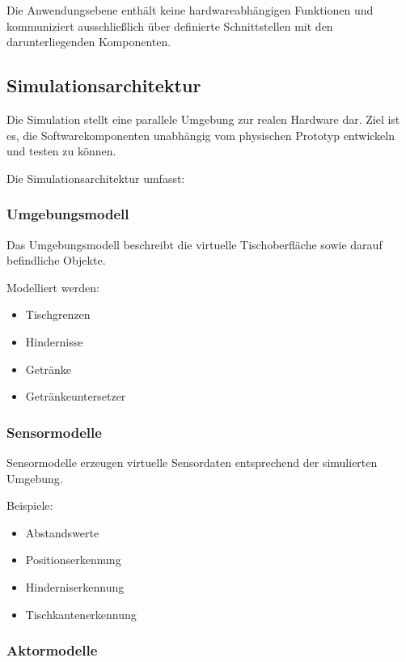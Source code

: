 Die Anwendungsebene enthält keine hardwareabhängigen Funktionen und
kommuniziert ausschließlich über definierte Schnittstellen mit den
darunterliegenden Komponenten.

\subsection{Simulationsarchitektur}\label{simulationsarchitektur}

Die Simulation stellt eine parallele Umgebung zur realen Hardware dar.
Ziel ist es, die Softwarekomponenten unabhängig vom physischen Prototyp
entwickeln und testen zu können.

Die Simulationsarchitektur umfasst:

\subsubsection{Umgebungsmodell}\label{umgebungsmodell}

Das Umgebungsmodell beschreibt die virtuelle Tischoberfläche sowie
darauf befindliche Objekte.

Modelliert werden:

\begin{itemize}
\tightlist
\item
  Tischgrenzen
\item
  Hindernisse
\item
  Getränke
\item
  Getränkeuntersetzer
\end{itemize}

\subsubsection{Sensormodelle}\label{sensormodelle}

Sensormodelle erzeugen virtuelle Sensordaten entsprechend der
simulierten Umgebung.

Beispiele:

\begin{itemize}
\tightlist
\item
  Abstandswerte
\item
  Positionserkennung
\item
  Hinderniserkennung
\item
  Tischkantenerkennung
\end{itemize}

\subsubsection{Aktormodelle}\label{aktormodelle}


